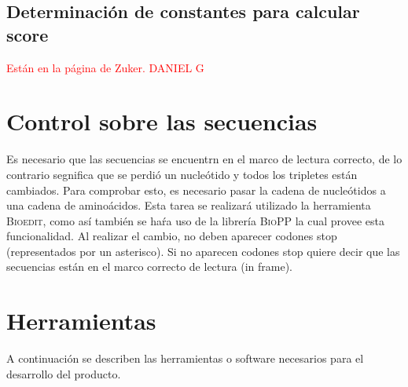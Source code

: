 \documentclass[12pt,a4paper,spanish]{article}
\begin{document}
	\subsection{Determinación de constantes para calcular score}
		\textcolor{red}{Están en la página de Zuker. DANIEL G}

\section{Control sobre las secuencias}	
	\par Es necesario que las secuencias se encuentrn en el marco de lectura correcto, de lo contrario segnifica que se perdió un nucleótido y todos los 		tripletes están cambiados. Para comprobar esto, es necesario pasar la cadena de nucleótidos a una cadena de aminoácidos. Esta tarea se realizará
	utilizado la herramienta \textsc{Bioedit}, como así también se haŕa uso de la librería \textsc{BioPP} la cual provee esta funcionalidad.	
	Al realizar el cambio, no deben aparecer codones stop (representados por un asterisco). Si no aparecen codones stop quiere decir que las secuencias 	están en el marco correcto de lectura (in frame).
	
\section{Herramientas} 
	A continuación se describen las herramientas o software necesarios para el desarrollo del producto.
\end{document}
